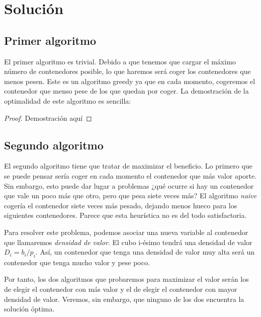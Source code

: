 \documentclass[a4paper, 11pt]{article}
\begin{document}
\section{Solución}
\subsection{Primer algoritmo}
El primer algoritmo es trivial. Debido a que tenemos que cargar el máximo número de contenedores posible, lo que haremos será coger los contenedores que menos pesen. Este es un algoritmo greedy ya que en cada momento, cogeremos el contenedor que menso pese de los que quedan por coger. La demostración de la optimalidad de este algoritmo es sencilla:
\begin{proof}
Demostración aquí
\end{proof}

\subsection{Segundo algoritmo}
El segundo algoritmo tiene que tratar de maximizar el beneficio. Lo primero que se puede pensar sería coger en cada momento el contenedor que más valor aporte. Sin embargo, esto puede dar lugar a problemas ¿qué ocurre si hay un contenedor que vale un poco más que otro, pero que pesa siete veces más? El algoritmo \textit{naive} cogería el contenedor siete veces más pesado, dejando menos hueco para los siguientes contenedores. Parece que esta heurística no es del todo satisfactoria.

Para resolver este problema, podemos asociar una nueva variable al contenedor que llamaremos \textit{densidad de valor}. El cubo i-ésimo tendrá una densidad de valor $D_i = b_i/p_i$. Así, un contenedor que tenga una densidad de valor muy alta será un contenedor que tenga mucho valor y pese poco.

Por tanto, los dos algoritmos que probaremos para maximizar el valor serán los de elegir el contenedor con más valor y el de elegir el contenedor con mayor densidad de valor. Veremos, sin embargo, que ninguno de los dos encuentra la solución óptima.
\end{document}
